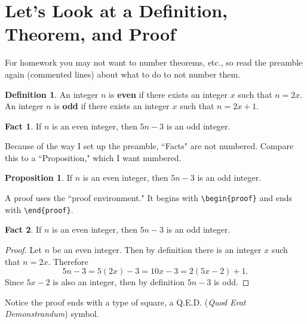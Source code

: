 \documentclass[12pt]{article}
\theoremstyle{definition}
\newtheorem{definition}{Definition}[section]
\newtheorem{proposition}{Proposition}[section]
\newtheorem*{fact}{Fact}
\begin{document}
\section{Let's Look at a Definition, Theorem, and Proof}
For homework you may not want to number theorems, etc., so read the preamble again (commented lines) about what to do to not number them.
\begin{definition}
An integer $n$ is \textbf{even} if there exists an integer $x$ such that $n=2x$.  An integer $n$ is \textbf{odd} if there exists an integer $x$ such that $n=2x+1$.
\end{definition}
\begin{fact}
If $n$ is an even integer, then $5n-3$ is an odd integer.
\end{fact}
\noindent
Because of the way I set up the preamble, ``Facts" are not numbered.  Compare this to a ``Proposition," which I want numbered.
\begin{proposition}
If $n$ is an even integer, then $5n-3$ is an odd integer.
\end{proposition}
\noindent
A proof uses the ``proof environment."  It begins with \verb!\begin{proof}! and ends with \verb!\end{proof}!.
\begin{fact}
If $n$ is an even integer, then $5n-3$ is an odd integer.
\end{fact}
\begin{proof}
Let $n$ be an even integer.  Then by definition there is an integer $x$ such that $n=2x$.  Therefore
\[
5n-3=5(2x)-3=10x-3=2(5x-2)+1.
\]
Since $5x-2$ is also an integer, then by definition $5n-3$ is odd.
\end{proof}
\noindent
Notice the proof ends with a type of square, a Q.E.D. (\textit{Quod Erat Demonstrandum}) symbol.
\end{document}
